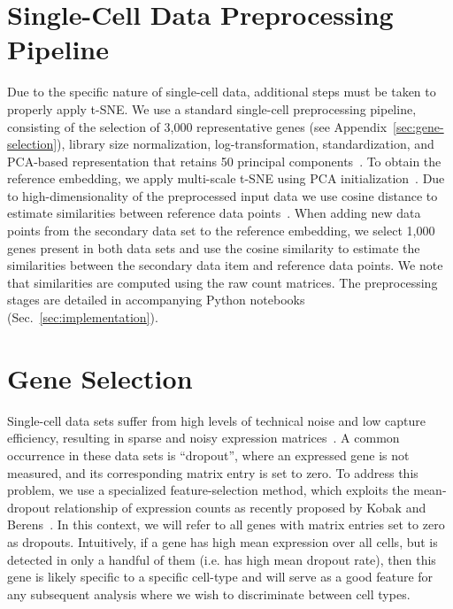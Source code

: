 \documentclass[runningheads]{llncs}
\newcommand{\beginsupplement}{%
  \setcounter{table}{0}
  \renewcommand{\thetable}{S\arabic{table}}%
  \setcounter{figure}{0}
  \renewcommand{\thefigure}{S\arabic{figure}}%
}
\begin{document}
\newpage
\appendix
\beginsupplement

\section{Single-Cell Data Preprocessing Pipeline\label{sec:sc-pipeline}}

Due to the specific nature of single-cell data, additional steps must be taken
to properly apply t-SNE. We use a standard single-cell preprocessing
pipeline, consisting of the selection of 3,000 representative genes
(see Appendix~\ref{sec:gene-selection}), library size normalization,
log-transformation, standardization, and PCA-based representation that
retains 50 principal components~\cite{Stuart2019,Wolf2018}. To obtain the
reference embedding, we apply multi-scale t-SNE using PCA
initialization~\cite{Kobak2019}. Due to high-dimensionality of the
preprocessed input data we use cosine distance to estimate similarities
between reference data points~\cite{Domingos2012}. When adding new data
points from the secondary data set to the reference embedding, we select
1,000 genes present in both data sets and use the cosine similarity to
estimate the similarities between the secondary data item and reference data
points. We note that similarities are computed using the raw count matrices.
The preprocessing stages are detailed in accompanying Python notebooks
(Sec.~\ref{sec:implementation}).

\section{Gene Selection\label{sec:gene-selection}}

Single-cell data sets suffer from high levels of technical noise and low
capture efficiency, resulting in sparse and noisy expression matrices~\cite{umi}. A common occurrence in these data sets is ``dropout'', where an
expressed gene is not measured, and its corresponding matrix entry is set to
zero. To address this problem, we use a specialized feature-selection method,
which exploits the mean-dropout relationship of expression counts as recently
proposed by Kobak and Berens~\cite{Kobak2019}. In this context, we will refer
to all genes with matrix entries set to zero as dropouts. Intuitively, if a
gene has high mean expression over all cells, but is detected in only a
handful of them (i.e. has high mean dropout rate), then this gene is likely
specific to a specific cell-type and will serve as a good feature for any
subsequent analysis where we wish to discriminate between cell types.
\end{document}
